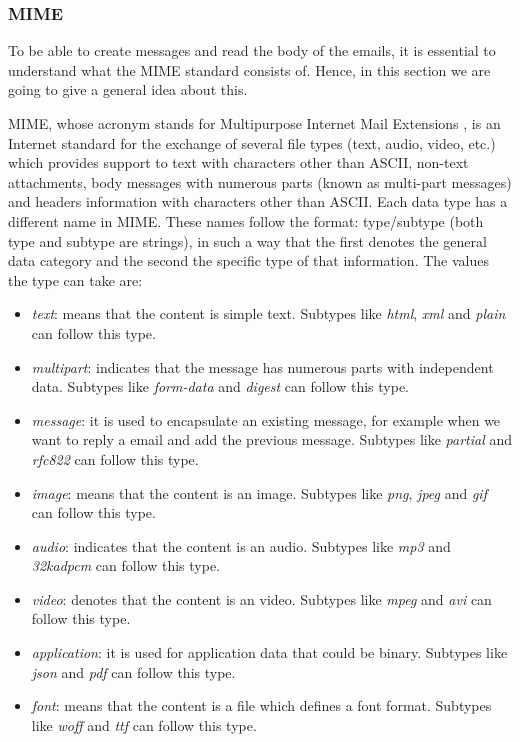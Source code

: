 \subsubsection{MIME} \label{sssect:mime}
To be able to create messages and read the body of the emails, it is essential to understand what the MIME standard consists of. Hence, in this section we are going to give a general idea about this.

MIME, whose acronym stands for Multipurpose Internet Mail Extensions \citep{wikimime, rfc2045}, is an Internet standard for the exchange of several file types (text, audio, video, etc.) which provides support to text with characters other than ASCII, non-text attachments, body messages with numerous parts (known as multi-part messages) and headers information with characters other than ASCII. Each data type has a different name in MIME. These names follow the format: type/subtype (both type and subtype are strings), in such a way that the first denotes the general data category and the second the specific type of that information. The values the type can take are:

\begin{itemize}
	\item\textit{text}: means that the content is simple text. Subtypes like \textit{html}, \textit{xml} and \textit{plain} can follow this type.
	\item\textit{multipart}: indicates that the message has numerous parts with independent data. Subtypes like \textit{form-data} and \textit{digest} can follow this type.
	\item\textit{message}: it is used to encapsulate an existing message, for example when we want to reply a email and add the previous message. Subtypes like \textit{partial} and \textit{rfc822} can follow this type.
	\item\textit{image}: means that the content is an image. Subtypes like \textit{png}, \textit{jpeg} and \textit{gif} can follow this type.
	\item\textit{audio}: indicates that the content is an audio. Subtypes like \textit{mp3} and \textit{32kadpcm} can follow this type.
	\item\textit{video}: denotes that the content is an video. Subtypes like \textit{mpeg} and \textit{avi} can follow this type.
	\item\textit{application}: it is used for application data that could be binary. Subtypes like \textit{json} and \textit{pdf} can follow this type.
	\item\textit{font}: means that the content is a file which defines a font format. Subtypes like \textit{woff} and \textit{ttf} can follow this type.
\end{itemize}

